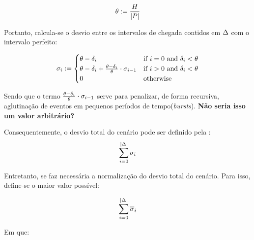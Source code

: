 \documentclass{anpet}
\begin{document}
\begin{equation}
    \theta := \frac{H}{|P|}
    \label{eq:van_lon_measures_2016_perfectInterval}
\end{equation}

Portanto, calcula-se o desvio entre os intervalos de chegada contidos em $\Delta$ com o intervalo perfeito:

\begin{equation}
    \sigma_i :=
        \begin{cases}
            \theta - \delta_i & \text{if $i = 0$ and $\delta_i < \theta$} \\
            
            \theta - \delta_i + \frac{\theta-\delta_i}{\theta} \cdot \sigma_{i-1} & \text{if $i > 0$ and $\delta_i < \theta$} \\
            
            0 & \text{otherwise}
        \end{cases}
    \label{eq:van_lon_measures_2016_deviationFromPerfectInterval}
\end{equation}

Sendo que o termo $\frac{\theta-\delta_i}{\theta} \cdot \sigma_{i-1}$ serve para penalizar, de forma recursiva, aglutinação de eventos em pequenos períodos de tempo(\textit{bursts}). \textbf{Não seria isso um valor arbitrário?}

Consequentemente, o desvio total do cenário pode ser definido pela :
\begin{equation}
    \sum_{i=0}^{|\Delta|} \sigma_i
    \label{eq:van_lon_measures_2016_totalDeviationFromPerfectInterval}
\end{equation}

Entretanto, se faz necessária a normalização do desvio total do cenário. Para isso, define-se o maior valor possível:

\begin{equation}
    \sum_{i=0}^{|\Delta|} \overline{\sigma}_i
    \label{eq:van_lon_measures_2016_bigestTotalDeviationFromPerfectInterval}
\end{equation}

Em que:
\end{document}
